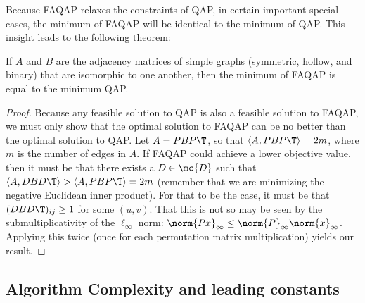 \documentclass[10pt,journal,cspaper,compsoc]{IEEEtran}
\begin{document}
Because FAQAP relaxes the constraints of QAP, in certain important special cases, the minimum of FAQAP will be identical to the minimum of QAP.  This insight leads to the following theorem:
\begin{thm}
	If $A$ and $B$ are the adjacency matrices of simple graphs (symmetric, hollow, and binary) that are isomorphic to one another, then the minimum of FAQAP is equal to the minimum QAP.
\end{thm}
\begin{proof}
Because any feasible solution to QAP is also a feasible solution to FAQAP, we must only show that the optimal solution to FAQAP can be no better than the optimal solution to QAP.  Let $A=PBP\T$, so that $\langle A, PBP\T\rangle=2m$, where $m$ is the number of edges in $A$.  If FAQAP could achieve a lower objective value, then it must be that there exists a $D \in \mc{D}$ such that $\langle A, DBD\T\rangle > \langle A, PBP\T\rangle = 2m$ (remember that we are minimizing the negative Euclidean inner product). For that to be the case, it must be that $(DBD\T)_{ij} \geq 1$ for some $(u,v)$.  That this is not so may be seen by the submultiplicativity of the $\ell_{\infty}$ norm:
$\norm{Px}_\infty \leq \norm{P}_\infty \norm{x}_\infty$.  Applying this twice (once for each permutation matrix multiplication) yields our result.
\end{proof}








\subsection{Algorithm Complexity and leading constants} %
\label{sub:algorithm_complexity_and_leading_constants}
\end{document}
